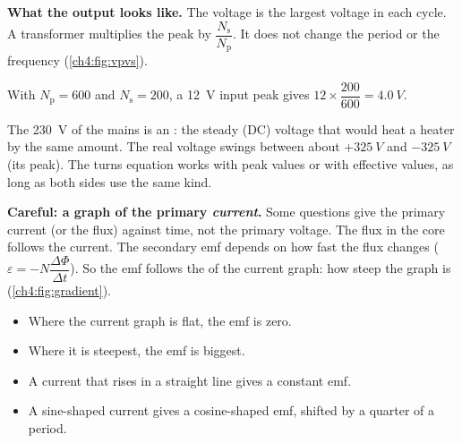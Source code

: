 \begin{sidebyside}[0.44]
  \textbf{What the output looks like.} The  voltage is the largest voltage in
  each cycle. A transformer multiplies the peak by $\dfrac{N_\mathrm{s}}{N_\mathrm{p}}$.
  It does not change the period or the frequency (\cref{ch4:fig:vpvs}).

  With $N_\mathrm{p} = 600$ and $N_\mathrm{s} = 200$, a \qty{12}{V} input peak gives
  $12 \times \dfrac{200}{600} = \qty{4.0}{V}$.
\nextside
  \centering
  \label{ch4:fig:vpvs}
\end{sidebyside}

The \qty{230}{V} of the mains is an : the steady (DC) voltage that
would heat a heater by the same amount. The real voltage swings between about
$+\qty{325}{V}$ and $-\qty{325}{V}$ (its peak). The turns equation works with peak values
or with effective values, as long as both sides use the same kind.

\textbf{Careful: a graph of the primary \emph{current}.} Some questions give the primary
current (or the flux) against time, not the primary voltage. The flux in the core follows
the current. The secondary emf depends on how fast the flux changes
($\varepsilon = -N\dfrac{\Delta\Phi}{\Delta t}$). So the emf follows the 
of the current graph: how steep the graph is (\cref{ch4:fig:gradient}).
\begin{itemize}
  \item Where the current graph is flat, the emf is zero.
  \item Where it is steepest, the emf is biggest.
  \item A current that rises in a straight line gives a constant emf.
  \item A sine-shaped current gives a cosine-shaped emf, shifted by a quarter of a period.
\end{itemize}

